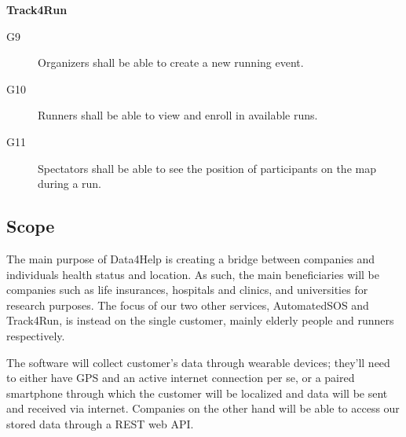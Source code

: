 \documentclass[../main.tex]{subfiles}
\begin{document}
\begin{minipage}{\textwidth}
{\bf Track4Run}
\begin{description}
	\item [G9]   Organizers shall be able to create a new running event.
	\item [G10]  Runners shall be able to view and enroll in available runs.
	\item [G11]  Spectators shall be able to see the position of participants on the map during a run.
\end{description}
\end{minipage}

\subsection{Scope}

The main purpose of Data4Help is creating a bridge between companies and individuals health status and location. As such, the main beneficiaries will be companies such as life insurances, hospitals and clinics, and universities for research purposes.
The focus of our two other services, AutomatedSOS and Track4Run, is instead on the single customer, mainly elderly people and runners respectively.

The software will collect customer's data through wearable devices; they'll need to either have GPS and an active internet connection per se, or a paired smartphone through which the customer will be localized and data will be sent and received via internet. Companies on the other hand will be able to access our stored data through a REST web API.

%
%
%
%
%
\end{document}
